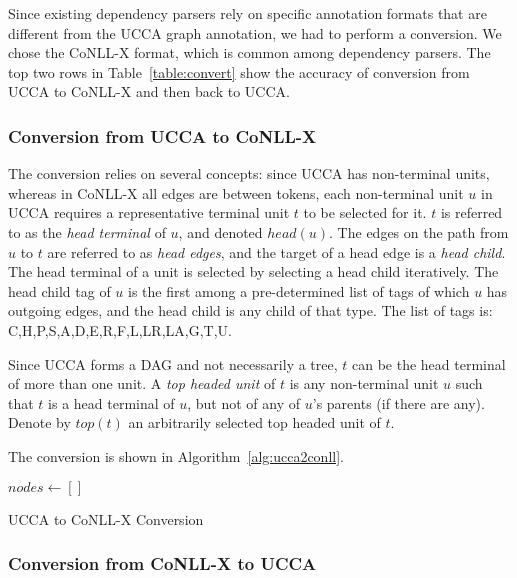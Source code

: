 \documentclass[11pt]{article}
\begin{document}
Since existing dependency parsers rely on specific annotation formats that are different from the UCCA graph annotation, we had to perform a conversion. We chose the CoNLL-X format, which is common among dependency parsers.
The top two rows in Table~\ref{table:convert} show the accuracy of conversion from UCCA to CoNLL-X and then back to UCCA.

\subsubsection{Conversion from UCCA to CoNLL-X}

The conversion relies on several concepts: since UCCA has non-terminal units, whereas in CoNLL-X all edges are between tokens, each non-terminal unit $u$ in UCCA requires a representative terminal unit $t$ to be selected for it. $t$ is referred to as the \textit{head terminal} of $u$, and denoted $head(u)$. The edges on the path from $u$ to $t$ are referred to as \textit{head edges}, and the target of a head edge is a \textit{head child}. The head terminal of a unit is selected by selecting a head child iteratively. The head child tag of $u$ is the first among a pre-determined list of tags of which $u$ has outgoing edges, and the head child is any child of that type. The list of tags is: \textsc{C,H,P,S,A,D,E,R,F,L,LR,LA,G,T,U}.

Since UCCA forms a DAG and not necessarily a tree, $t$ can be the head terminal of more than one unit. A \textit{top headed unit} of $t$ is any non-terminal unit $u$ such that $t$ is a head terminal of $u$, but not of any of $u$'s parents (if there are any). Denote by $top(t)$ an arbitrarily selected top headed unit of $t$.

The conversion is shown in Algorithm~\ref{alg:ucca2conll}.

\begin{algorithm}
 $nodes \leftarrow []$\;
 \caption{UCCA to CoNLL-X Conversion}
 \label{alg:ucca2conll}
\end{algorithm}

\subsubsection{Conversion from CoNLL-X to UCCA}
\end{document}
